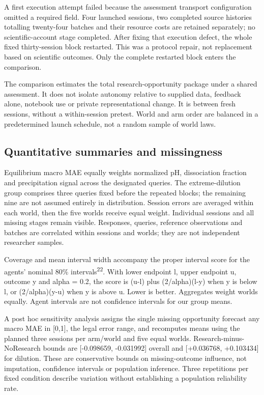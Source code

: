 \documentclass[12pt,a4paper]{article}
\begin{document}
A first execution attempt failed because the assessment transport configuration omitted a required field. Four launched sessions, two completed source histories totalling twenty-four batches and their resource costs are retained separately; no scientific-account stage completed. After fixing that execution defect, the whole fixed thirty-session block restarted. This was a protocol repair, not replacement based on scientific outcomes. Only the complete restarted block enters the comparison.

The comparison estimates the total research-opportunity package under a shared assessment. It does not isolate autonomy relative to supplied data, feedback alone, notebook use or private representational change. It is between fresh sessions, without a within-session pretest. World and arm order are balanced in a predetermined launch schedule, not a random sample of world laws.

\subsection{Quantitative summaries and missingness}\label{quantitative-summaries-and-missingness}

Equilibrium macro MAE equally weights normalized pH, dissociation fraction and precipitation signal across the designated queries. The extreme-dilution group comprises three queries fixed before the repeated blocks; the remaining nine are not assumed entirely in distribution. Session errors are averaged within each world, then the five worlds receive equal weight. Individual sessions and all missing stages remain visible. Responses, queries, reference observations and batches are correlated within sessions and worlds; they are not independent researcher samples.

Coverage and mean interval width accompany the proper interval score for the agents' nominal 80\% intervals\textsuperscript{22}. With lower endpoint l, upper endpoint u, outcome y and alpha = 0.2, the score is (u-l) plus (2/alpha)(l-y) when y is below l, or (2/alpha)(y-u) when y is above u. Lower is better. Aggregates weight worlds equally. Agent intervals are not confidence intervals for our group means.

A post hoc sensitivity analysis assigns the single missing opportunity forecast any macro MAE in {[}0,1{]}, the legal error range, and recomputes means using the planned three sessions per arm/world and five equal worlds. Research-minus-NoResearch bounds are {[}-0.098659, -0.031992{]} overall and {[}+0.036768, +0.103434{]} for dilution. These are conservative bounds on missing-outcome influence, not imputation, confidence intervals or population inference. Three repetitions per fixed condition describe variation without establishing a population reliability rate.
\end{document}
